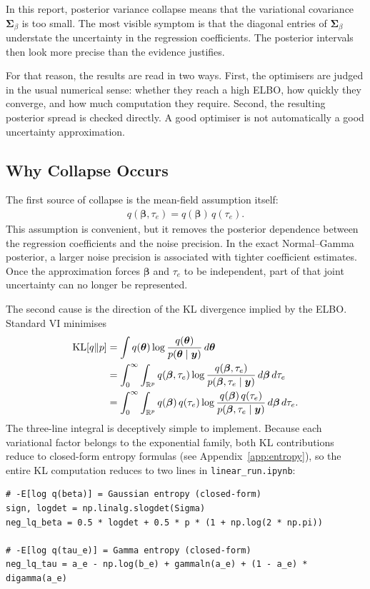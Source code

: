 \documentclass[11pt,a4paper]{article}
\newcommand{\R}{\mathbb{R}}
\begin{document}
In this report, posterior variance collapse means that the variational covariance $\bm{\Sigma}_\beta$ is too small. The most visible symptom is that the diagonal entries of $\bm{\Sigma}_\beta$ understate the uncertainty in the regression coefficients. The posterior intervals then look more precise than the evidence justifies.

For that reason, the results are read in two ways. First, the optimisers are judged in the usual numerical sense: whether they reach a high ELBO, how quickly they converge, and how much computation they require. Second, the resulting posterior spread is checked directly. A good optimiser is not automatically a good uncertainty approximation.

\subsection{Why Collapse Occurs}

The first source of collapse is the mean-field assumption itself:
\begin{align}
q(\bm{\beta},\tau_e) = q(\bm{\beta})\,q(\tau_e).
\end{align}
This assumption is convenient, but it removes the posterior dependence between the regression coefficients and the noise precision. In the exact Normal--Gamma posterior, a larger noise precision is associated with tighter coefficient estimates. Once the approximation forces $\bm{\beta}$ and $\tau_e$ to be independent, part of that joint uncertainty can no longer be represented.

The second cause is the direction of the KL divergence implied by the ELBO. Standard VI minimises
\begin{align}
\mathrm{KL}[q\|p] &= \int q(\bm{\theta})\log\frac{q(\bm{\theta})}{p(\bm{\theta}\mid\bm{y})}\,d\bm{\theta} \notag\\
                   &= \int_0^\infty \int_{\R^p} q(\bm{\beta},\tau_e)\log\frac{q(\bm{\beta},\tau_e)}{p(\bm{\beta},\tau_e\mid\bm{y})}\,d\bm{\beta}\,d\tau_e \notag\\
                   &= \int_0^\infty \int_{\R^p} q(\bm{\beta})\,q(\tau_e)\log\frac{q(\bm{\beta})\,q(\tau_e)}{p(\bm{\beta},\tau_e\mid\bm{y})}\,d\bm{\beta}\,d\tau_e.
\end{align}
The three-line integral is deceptively simple to implement.
Because each variational factor belongs to the exponential family, both KL contributions reduce to closed-form entropy formulas (see Appendix~\ref{app:entropy}),
so the entire KL computation reduces to two lines in \texttt{linear\_run.ipynb}:
\begin{verbatim}
# -E[log q(beta)] = Gaussian entropy (closed-form)
sign, logdet = np.linalg.slogdet(Sigma)
neg_lq_beta = 0.5 * logdet + 0.5 * p * (1 + np.log(2 * np.pi))

# -E[log q(tau_e)] = Gamma entropy (closed-form)
neg_lq_tau = a_e - np.log(b_e) + gammaln(a_e) + (1 - a_e) * digamma(a_e)
\end{verbatim}
\end{document}
